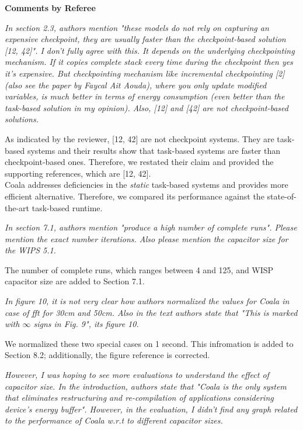 \documentclass[10pt]{article}
\newcommand{\referee}[1]{
	{\item \color{OliveGreen} \emph{{#1}}}
	\label{R\therefereeCounter:\arabic{enumi}}
}
\newcommand{\response}[1]{{\color{blue} #1}}
\newcounter{refereeCounter}
\newenvironment{responses}{%
\refstepcounter{refereeCounter}%
\textbf{\large Comments by Referee \therefereeCounter}
\begin{enumerate}%
\renewcommand{\labelenumi}{\textbf{[C:\,\arabic{enumi}]}} %
}{\end{enumerate}}
\begin{document}
\begin{responses}
	
\referee{In section 2.3, authors mention "these models do not rely on capturing an expensive checkpoint, they are usually faster than the checkpoint-based solution [12, 42]". I don't fully agree with this. It depends on the underlying checkpointing mechanism. If it copies complete stack every time during the checkpoint then yes it's expensive. But checkpointing mechanism like incremental checkpointing [2] (also see the paper by Faycal Ait Aouda), where you only update modified variables, is much better in terms of energy consumption (even better than the task-based solution in my opinion). Also, [12] and [42] are not checkpoint-based solutions.}

\response{As indicated by the reviewer, [12, 42] are not checkpoint systems. They are task-based systems and their results show that task-based systems are faster than checkpoint-based ones. Therefore, we restated their claim and provided the supporting references, which are [12, 42].\\
 Coala addresses deficiencies in the \emph{static} task-based systems and provides more efficient alternative. Therefore, we compared its performance against the state-of-the-art task-based runtime.}

\referee{In section 7.1, authors mention "produce a high number of complete runs". Please mention the exact number iterations. Also please mention the capacitor size for the WIPS 5.1.}

\response{The number of complete runs, which ranges between 4 and 125, and WISP capacitor size are added to Section 7.1.}

\referee{In figure 10, it is not very clear how authors normalized the values for Coala in case of fft for 30cm and 50cm. Also in the text authors state that "This is marked with $\infty$ signs in Fig. 9", its figure 10. }	

\response{We normalized these two special cases on 1 second. This infromation is added to Section 8.2; additionally, the figure reference is corrected. }

\referee{However, I was hoping to see more evaluations to understand the effect of capacitor size. In the introduction, authors state that "Coala is the only system that eliminates restructuring and re-compilation of applications considering device’s energy buffer". However, in the evaluation, I didn't find any graph related to the performance of Coala w.r.t to different capacitor sizes.}


\end{responses}
\end{document}
